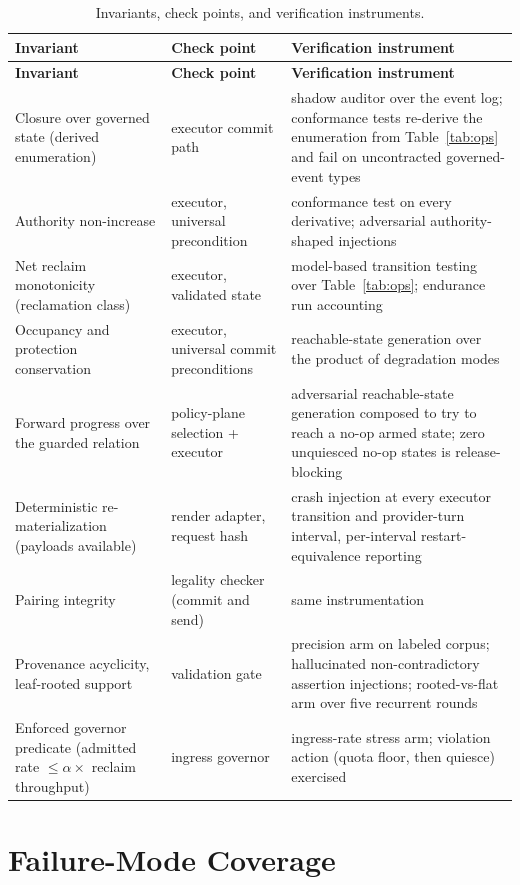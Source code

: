 \documentclass[11pt]{article}
\begin{document}
{\footnotesize
\begin{longtable}{@{}p{4.6cm}p{4.2cm}p{6.2cm}@{}}
\caption{Invariants, check points, and verification instruments.}\label{tab:invariants}\\
\toprule
\textbf{Invariant} & \textbf{Check point} & \textbf{Verification instrument} \\
\midrule
\endfirsthead
\toprule
\textbf{Invariant} & \textbf{Check point} & \textbf{Verification instrument} \\
\midrule
\endhead
Closure over governed state (derived enumeration) & executor commit path & shadow auditor over the event log; conformance tests re-derive the enumeration from Table~\ref{tab:ops} and fail on uncontracted governed-event types \\
Authority non-increase & executor, universal precondition & conformance test on every derivative; adversarial authority-shaped injections \\
Net reclaim monotonicity (reclamation class) & executor, validated state & model-based transition testing over Table~\ref{tab:ops}; endurance run accounting \\
Occupancy and protection conservation & executor, universal commit preconditions & reachable-state generation over the product of degradation modes \\
Forward progress over the guarded relation & policy-plane selection + executor & adversarial reachable-state generation composed to try to reach a no-op armed state; zero unquiesced no-op states is release-blocking \\
Deterministic re-materialization (payloads available) & render adapter, request hash & crash injection at every executor transition and provider-turn interval, per-interval restart-equivalence reporting \\
Pairing integrity & legality checker (commit and send) & same instrumentation \\
Provenance acyclicity, leaf-rooted support & validation gate & precision arm on labeled corpus; hallucinated non-contradictory assertion injections; rooted-vs-flat arm over five recurrent rounds \\
Enforced governor predicate (admitted rate $\le \alpha \times$ reclaim throughput) & ingress governor & ingress-rate stress arm; violation action (quota floor, then quiesce) exercised \\
\bottomrule
\end{longtable}
}

\section{Failure-Mode Coverage}
\end{document}
